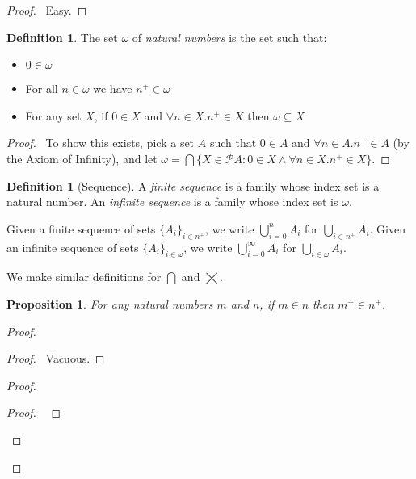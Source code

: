 \documentclass{report}
\let\qed\relax
\newtheorem{prop}[ax]{Proposition}
\theoremstyle{definition}
\newtheorem{df}[ax]{Definition}
\begin{document}
\begin{proof}
\pf\ Easy. \qed
\end{proof}

\begin{df}
The set $\omega$ of \emph{natural numbers} is the set such that:
\begin{itemize}
\item $0 \in \omega$
\item For all $n \in \omega$ we have $n^+ \in \omega$
\item For any set $X$, if $0 \in X$ and $\forall n \in X. n^+ \in X$ then $\omega \subseteq X$
\end{itemize}
\end{df}

\begin{proof}
\pf\ To show this exists, pick a set $A$ such that $0 \in A$ and $\forall n \in A. n^+ \in A$ (by the Axiom of Infinity), and let $\omega = \bigcap \{ X \in \mathcal{P} A : 0 \in X \wedge \forall n \in X. n^+ \in X \}$. \qed
\end{proof}

\begin{df}[Sequence]
A \emph{finite sequence} is a family whose index set is a natural number. An \emph{infinite sequence} is a family whose index set is $\omega$.

Given a finite sequence of sets $\{ A_i \}_{i \in n^+}$, we write $\bigcup_{i=0}^n A_i$ for $\bigcup_{i \in n^+} A_i$. Given an infinite sequence of sets $\{ A_i \}_{i \in \omega}$, we write $\bigcup_{i=0}^\infty A_i$ for $\bigcup_{i \in \omega} A_i$.

We make similar definitions for $\bigcap$ and $\bigtimes$.
\end{df}

\begin{prop}
\label{prop:succ_in_succ}
For any natural numbers $m$ and $n$, if $m \in n$ then $m^+ \in n^+$.
\end{prop}

\begin{proof}
\pf
{}
\begin{proof}
	\pf\ Vacuous.
\end{proof}
\begin{proof}
	\begin{proof}
		\pf\ 
	\end{proof}
\end{proof}
\qed
\end{proof}
\end{document}
